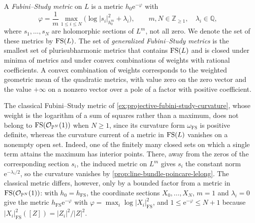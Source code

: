 \begin{definition}\label{def:section-fubini-study-metrics}
A \emph{Fubini--Study metric} on $L$ is a metric $h_0\mathrm e^{-\varphi}$ with
\[
 \varphi=\frac1m\max_{1\leq i\leq N}
          \bigl(\log|s_i|_{h_0^m}^2+\lambda_i\bigr),
 \qquad m,N\in\mathbb Z_{\geq1},\quad \lambda_i\in\mathbb Q,
\]
where $s_1,\ldots,s_N$ are holomorphic sections of $L^m$, not all zero. We denote the set of these metrics by $\mathrm{FS}(L)$. The set of \emph{generalized Fubini--Study metrics} is the smallest set of plurisubharmonic metrics that contains $\mathrm{FS}(L)$ and is closed under minima of metrics and under convex combinations of weights with rational coefficients. A convex combination of weights corresponds to the weighted geometric mean of the quadratic metrics, with value zero on the zero vector and the value $+\infty$ on a nonzero vector over a pole of a factor with positive coefficient.
\end{definition}
The classical Fubini--Study metric of \cref{ex:projective-fubini-study-curvature}, whose weight is the logarithm of a sum of squares rather than a maximum, does not belong to $\mathrm{FS}(\mathcal O_{\mathbb P^N}(1))$ when $N\geq1$, since its curvature form $\omega_{\mathrm{FS}}$ is positive definite, whereas the curvature current of a metric in $\mathrm{FS}(L)$ vanishes on a nonempty open set. Indeed, one of the finitely many closed sets on which a single term attains the maximum has interior points. There, away from the zeros of the corresponding section $s_i$, the induced metric on $L^m$ gives $s_i$ the constant norm $\mathrm e^{-\lambda_i/2}$, so the curvature vanishes by \cref{prop:line-bundle-poincare-lelong}. The classical metric differs, however, only by a bounded factor from a metric in $\mathrm{FS}(\mathcal O_{\mathbb P^N}(1))$: with $h_0=h_{\mathrm{FS}}$, the coordinate sections $X_0,\ldots,X_N$, $m=1$ and $\lambda_i=0$ give the metric $h_{\mathrm{FS}}\mathrm e^{-\varphi}$ with $\varphi=\max_i\log|X_i|_{\mathrm{FS}}^2$, and $1\leq\mathrm e^{-\varphi}\leq N+1$ because $|X_i|_{\mathrm{FS}}^2([Z])=|Z_i|^2/|Z|^2$.

